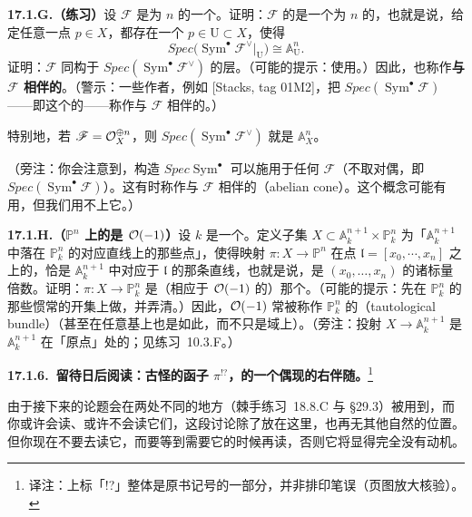 \textbf{17.1.G.（练习）}\quad 设 $\mathscr{F}$ 是\trRank{}为 $n$ 的一个\trLocallyFreeSheaf。证明：$\mathscr{F}$ 的\trTotalSpace{}是一个\trRank{}为 $n$ 的\emph{\trVectorBundle}，也就是说，给定任意一点 $p\in X$，都存在一个\trOpen\trNeighborhood{} $p\in\mathrm{U}\subset X$，使得
\[
\mathit{Spec}\bigl(\operatorname{Sym}^\bullet\mathscr{F}^{\vee}|_{\mathrm{U}}\bigr)\cong\mathbb{A}^n_{\mathrm{U}}.
\]
证明：$\mathscr{F}$ 同构于\trTotalSpace{} $\mathit{Spec}(\operatorname{Sym}^\bullet\mathscr{F}^{\vee})$ 的\trSection{}层。（可能的提示：使用\trTransitionFunction。）因此，\trTotalSpace{}也称作\textbf{与\trLocallyFreeSheaf{} $\mathscr{F}$ 相伴的\trVectorBundle}。（警示：一些作者，例如 [Stacks, tag 01M2]，把 $\mathit{Spec}(\operatorname{Sym}^\bullet\mathscr{F})$——即这个\trVectorBundle{}的\trDual——称作与 $\mathscr{F}$ 相伴的\trVectorBundle。）

特别地，若 $\mathscr{F}=\mathcal{O}_X^{\oplus n}$，则 $\mathit{Spec}(\operatorname{Sym}^\bullet\mathscr{F}^{\vee})$ 就是 $\mathbb{A}^n_X$。

（旁注：你会注意到，构造 $\mathit{Spec}\operatorname{Sym}^\bullet$ 可以施用于任何\trCoherentSheaf{} $\mathscr{F}$（不取对偶，即 $\mathit{Spec}(\operatorname{Sym}^\bullet\mathscr{F})$）。这有时称作与 $\mathscr{F}$ 相伴的\textbf{\trAbelian\trCone}（abelian cone）。这个概念可能有用，但我们用不上它。）

\textbf{17.1.H.（$\mathbb{P}^n$ 上的\trTautologicalBundle{}是 $\mathcal{O}(-1)$）}\quad 设 $k$ 是一个\trField。定义子集 $X\subset\mathbb{A}^{n+1}_k\times\mathbb{P}^n_k$ 为「$\mathbb{A}^{n+1}_k$ 中落在 $\mathbb{P}^n_k$ 的对应直线上的那些点」，使得映射 $\pi\colon X\to\mathbb{P}^n$ 在点 $\mathfrak{l}=[x_0,\cdots,x_n]$ 之上的\trFiber，恰是 $\mathbb{A}^{n+1}_k$ 中对应于 $\mathfrak{l}$ 的那条直线，也就是说，是 $(x_0,\dots,x_n)$ 的诸标量倍数。证明：$\pi\colon X\to\mathbb{P}^n_k$ 是（相应于\trInvertibleSheaf{} $\mathcal{O}(-1)$ 的）那个\trLineBundle。（可能的提示：先在 $\mathbb{P}^n_k$ 的那些惯常的\trAffine{}开集上做，并弄清\trTransitionFunction。）因此，$\mathcal{O}(-1)$ 常被称作 $\mathbb{P}^n_k$ 的\textbf{\trTautologicalBundle}（tautological bundle）（甚至在任意基上也是如此，而不只是域上）。（旁注：投射 $X\to\mathbb{A}^{n+1}_k$ 是 $\mathbb{A}^{n+1}_k$ 在「原点」处的\trBlowup；见\mbox{练习~10.3.F}。）

\textbf{17.1.6.\ 留待日后阅读：古怪的函子 $\pi^{!?}$，\trPushforward{}的一个偶现的右伴随。}\footnote{译注：上标「!?」整体是原书记号的一部分，并非排印笔误（页图放大核验）。}

由于接下来的论题会在两处不同的地方（\mbox{棘手练习~18.8.C} 与 \S29.3）被用到，而你或许会读、或许不会读它们，这段讨论除了放在这里，也再无其他自然的位置。但你现在不要去读它，而要等到需要它的时候再读，否则它将显得完全没有动机。

